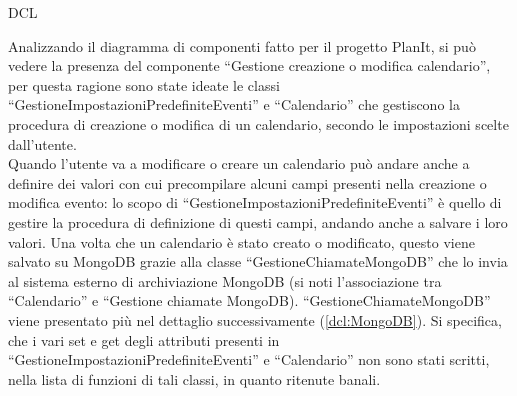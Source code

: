 \begin{listaPersonale}{DCL}
    \begin{center}
        
    \end{center}
    \newpage



    \begin{listaPersonale2}[DCL]{}

        Analizzando il diagramma di componenti fatto per il progetto PlanIt, si può vedere la presenza del componente “Gestione creazione o modifica calendario”, per questa ragione sono state ideate le classi “GestioneImpostazioniPredefiniteEventi” e “Calendario”  che gestiscono la procedura di creazione o modifica di un calendario, secondo le impostazioni scelte dall'utente. \\
        Quando l'utente va a modificare o creare un calendario può andare anche a definire dei valori con cui precompilare alcuni campi presenti nella creazione o modifica evento: lo scopo di “GestioneImpostazioniPredefiniteEventi” è quello di gestire la procedura di definizione di questi campi, andando anche a salvare i loro valori. Una volta che un calendario è stato creato o modificato, questo viene salvato su MongoDB grazie alla classe “GestioneChiamateMongoDB” che lo invia al sistema esterno di archiviazione MongoDB (si noti l'associazione tra “Calendario” e “Gestione chiamate MongoDB).
        “GestioneChiamateMongoDB” viene presentato più nel dettaglio successivamente (\ref{dcl:MongoDB}).
        Si specifica, che i vari set e get degli attributi presenti in “GestioneImpostazioniPredefiniteEventi” e “Calendario” non sono stati scritti, nella lista di funzioni di tali classi, in quanto ritenute banali.


        \begin{center}
            
        \end{center}



\end{listaPersonale2}
\end{listaPersonale}
